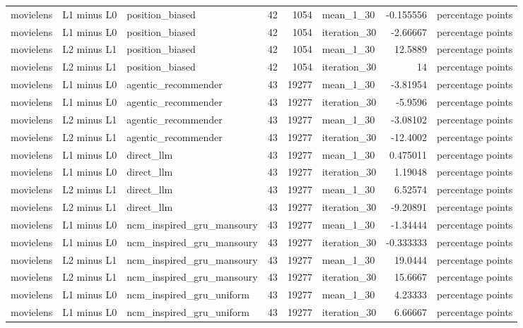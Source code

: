\begin{table}[htbp!]
\begin{tabular}{lllrrlrl}
movielens & L1 minus L0 & position\_biased & 42 & 1054 & mean\_1\_30 & -0.155556 & percentage points \\
movielens & L1 minus L0 & position\_biased & 42 & 1054 & iteration\_30 & -2.66667 & percentage points \\
movielens & L2 minus L1 & position\_biased & 42 & 1054 & mean\_1\_30 & 12.5889 & percentage points \\
movielens & L2 minus L1 & position\_biased & 42 & 1054 & iteration\_30 & 14 & percentage points \\
movielens & L1 minus L0 & agentic\_recommender & 43 & 19277 & mean\_1\_30 & -3.81954 & percentage points \\
movielens & L1 minus L0 & agentic\_recommender & 43 & 19277 & iteration\_30 & -5.9596 & percentage points \\
movielens & L2 minus L1 & agentic\_recommender & 43 & 19277 & mean\_1\_30 & -3.08102 & percentage points \\
movielens & L2 minus L1 & agentic\_recommender & 43 & 19277 & iteration\_30 & -12.4002 & percentage points \\
movielens & L1 minus L0 & direct\_llm & 43 & 19277 & mean\_1\_30 & 0.475011 & percentage points \\
movielens & L1 minus L0 & direct\_llm & 43 & 19277 & iteration\_30 & 1.19048 & percentage points \\
movielens & L2 minus L1 & direct\_llm & 43 & 19277 & mean\_1\_30 & 6.52574 & percentage points \\
movielens & L2 minus L1 & direct\_llm & 43 & 19277 & iteration\_30 & -9.20891 & percentage points \\
movielens & L1 minus L0 & ncm\_inspired\_gru\_mansoury & 43 & 19277 & mean\_1\_30 & -1.34444 & percentage points \\
movielens & L1 minus L0 & ncm\_inspired\_gru\_mansoury & 43 & 19277 & iteration\_30 & -0.333333 & percentage points \\
movielens & L2 minus L1 & ncm\_inspired\_gru\_mansoury & 43 & 19277 & mean\_1\_30 & 19.0444 & percentage points \\
movielens & L2 minus L1 & ncm\_inspired\_gru\_mansoury & 43 & 19277 & iteration\_30 & 15.6667 & percentage points \\
movielens & L1 minus L0 & ncm\_inspired\_gru\_uniform & 43 & 19277 & mean\_1\_30 & 4.23333 & percentage points \\
movielens & L1 minus L0 & ncm\_inspired\_gru\_uniform & 43 & 19277 & iteration\_30 & 6.66667 & percentage points \\

\end{tabular}
\end{table}
